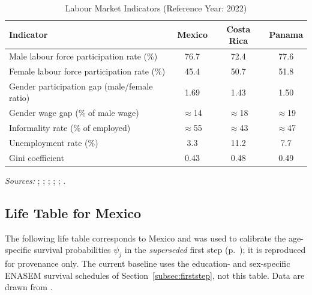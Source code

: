 \documentclass[12pt,a4paper]{article}
\begin{document}
\begin{appendices}
\begin{table}[H]
\centering
\caption{Labour Market Indicators (Reference Year: 2022)}
\label{tab:labour}
\begin{tabular}{lccc}
\hline\hline
\textbf{Indicator} & \textbf{Mexico} & \textbf{Costa Rica} & \textbf{Panama} \\
\hline
Male labour force participation rate (\%)    & 76.7        & 72.4        & 77.6        \\
Female labour force participation rate (\%)  & 45.4        & 50.7        & 51.8        \\
Gender participation gap (male/female ratio) & 1.69        & 1.43        & 1.50        \\
Gender wage gap (\% of male wage)            & $\approx$14 & $\approx$18 & $\approx$19 \\
Informality rate (\% of employed)            & $\approx$55 & $\approx$43 & $\approx$47 \\
Unemployment rate (\%)                       & 3.3         & 11.2        & 7.7         \\
Gini coefficient                             & 0.43        & 0.48        & 0.49        \\
\hline\hline
\end{tabular}
\begin{minipage}{\linewidth}
\smallskip
\footnotesize
\textit{Sources:} \citet{ILOILOSTAT2023}; \citet{ECLACILO2023};
\citet{IMF2023}; \citet{WEFGGR2024}; \citet{WorldBankWDI2024};
\citet{WorldBankPovCalNet2022}.
\end{minipage}
\end{table}

\subsection{Life Table for Mexico}
\label{app:survival}

The following life table corresponds to Mexico and was used to
calibrate the age-specific survival probabilities $\psi_{j}$ in the
\emph{superseded} first step (p.~\pageref{par:superseded}); it is reproduced
for provenance only. The current baseline uses the education- and
sex-specific ENASEM survival schedules of Section~\ref{subsec:firststep},
not this table. Data are drawn from \citet{UISP2019}.


\end{appendices}
\end{document}
